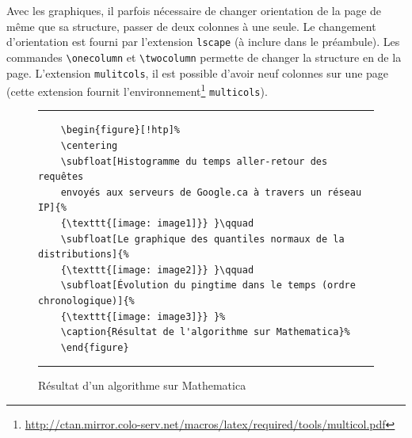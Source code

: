 %
\onecolumn
%
\par Avec les graphiques, il parfois nécessaire de changer orientation de la page de même que sa structure, passer de deux colonnes à une seule. Le changement d'orientation est fourni par l'extension \verb|lscape| (à inclure dans le préambule). Les commandes \verb|\onecolumn| et \verb|\twocolumn| permette de changer la structure en de la page. L'extension \verb|mulitcols|, il est possible d'avoir neuf colonnes sur une page (cette extension fournit l'environnement\footnote{\url{http://ctan.mirror.colo-serv.net/macros/latex/required/tools/multicol.pdf}} \verb|multicols|).

%
\begin{figure}[H]
	\centering
	\qquad
	\qquad
	\caption{Résultat d'un algorithme sur Mathematica}%
	\label{fig:example}%
	\hrule
	\begin{verbatim}
	\begin{figure}[!htp]%
	\centering
	\subfloat[Histogramme du temps aller-retour des requêtes
	envoyés aux serveurs de Google.ca à travers un réseau IP]{%
	{\texttt{[image: image1]}} }\qquad
	\subfloat[Le graphique des quantiles normaux de la distributions]{%
	{\texttt{[image: image2]}} }\qquad
	\subfloat[Évolution du pingtime dans le temps (ordre chronologique)]{%
	{\texttt{[image: image3]}} }%
	\caption{Résultat de l'algorithme sur Mathematica}%
	\end{figure}
	\end{verbatim}
	\hrule
\end{figure}
